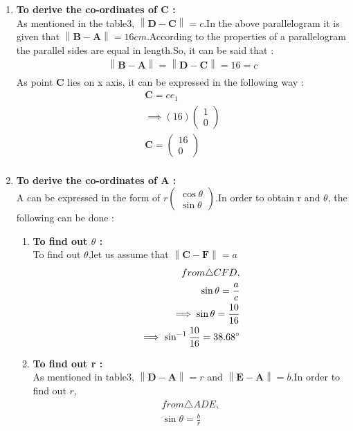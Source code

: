 \documentclass{article}
\providecommand{\norm}[1]{\left\lVert#1\right\rVert}
\newcommand{\myvec}[1]{\ensuremath{\begin{pmatrix}#1\end{pmatrix}}}
\let\vec\mathbf
\begin{document}
\begin{enumerate}
	\item \textbf{To derive the co-ordinates of C :}\\
		As mentioned in the table3, $\norm{\vec{D} - \vec{C}} = c$.In the above parallelogram it is given that $\norm{\vec{B} - \vec{A}} = 16cm$.According to the properties of a parallelogram the parallel sides are equal in length.So, it can be said that : \\
		\begin{align}
			\norm{\vec{B} - \vec{A}} = \norm{\vec{D} - \vec{C}} = 16 = c\\
		\end{align}
As point $\vec{C}$ lies on x axis, it can be expressed in the following way :\\
		\begin{align}
			\vec{C} = ce_1\\
			\implies (16)\myvec{1\\0}\\
			\vec{C} = \myvec{16\\0}\\
		\end{align}
	\item \textbf{To derive the co-ordinates of A :}\\
		A can be expressed in the form of $r\myvec{\cos{\theta}\\\sin{\theta}}$.In order to obtain r and $\theta$, the following can be done : \\
		\begin{enumerate}
			\item \textbf{To find out $\theta$ :}\\
		To find out $\theta$,let us assume that $\norm{\vec{C} - \vec{F}} = a$		
		\begin{align}
			from \triangle{CFD},\\
			\sin{\theta} = \frac{a}{c}\\
			\implies \sin{\theta} = \frac{10}{16}\\
			\implies \sin^{-1}{\frac{10}{16}} = 38.68\degree\\
		\end{align}
	\item \textbf{To find out r :}\\
		As mentioned in table3, $\norm{\vec{D} - \vec{A}} = r$ and $\norm{\vec{E} - \vec{A}} = b$.In order to find out $r$,
		\begin{align}
			from \triangle{ADE},\\
			\sin{\theta} = \frac{b}{r}\\

\end{align}
\end{enumerate}
\end{enumerate}
\end{document}
